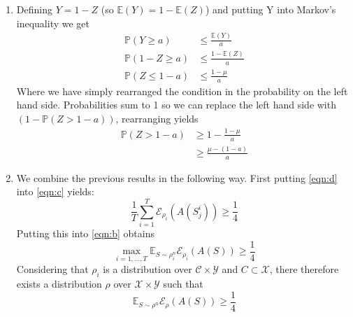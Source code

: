\documentclass{article}
\newcommand{\prob}[2]{\rho_#1^#2}
\newcommand{\expectation}{\mathbb{E}_{S\sim\prob{i}{n}}}
\begin{document}
\begin{enumerate}
\begin{enumerate}[label=\alph*.]
    \item Defining $Y=1-Z$ (so $\mathbb{E}(Y)=1-\mathbb{E}(Z)$) and putting Y into Markov's inequality we get
    \begin{align*}
        \mathbb{P}(Y\ge a)&\le\frac{\mathbb{E}(Y)}{a} \\
        \mathbb{P}(1-Z\ge a)&\le\frac{1-\mathbb{E}(Z)}{a} \\
        \mathbb{P}(Z\le 1-a)&\le\frac{1-\mu}{a}
    \end{align*}
    Where we have simply rearranged the condition in the probability on the left hand side. Probabilities sum to 1 so we can replace the left hand side with $(1-\mathbb{P}(Z>1-a))$, rearranging yields
    \begin{align}
        \mathbb{P}(Z>1-a) &\ge 1 - \frac{1-\mu}{a} \nonumber \\
                          &\ge \frac{\mu-(1-a)}{a} \label{eqn:e}
    \end{align}
    \item We combine the previous results in the following way. First putting \eqref{eqn:d} into \eqref{eqn:c} yields:
    \begin{equation*}
        \frac{1}{T}\sum\limits_{i=1}^{T}\mathcal{E}_{\rho_i}(A(S_j^i)) \ge \frac{1}{4}
    \end{equation*}
    Putting this into \eqref{eqn:b} obtains
    \begin{equation*}
        \max_{i=1,\dots,T} \expectation\mathcal{E}_{\rho_i}(A(S)) \ge \frac{1}{4}
    \end{equation*}
    Considering that $\rho_i$ is a distribution over $\mathcal{C} \times \mathcal{Y}$ and $C \subset \mathcal{X}$, there therefore exists a distribution $\rho$ over $\mathcal{X} \times \mathcal{Y}$ such that
    \begin{equation*}
        \mathbb{E}_{S\sim\prob{{}}{n}}\mathcal{E}_{\rho}(A(S)) \ge \frac{1}{4}
    \end{equation*}
    

\end{enumerate}
\end{enumerate}
\end{document}
